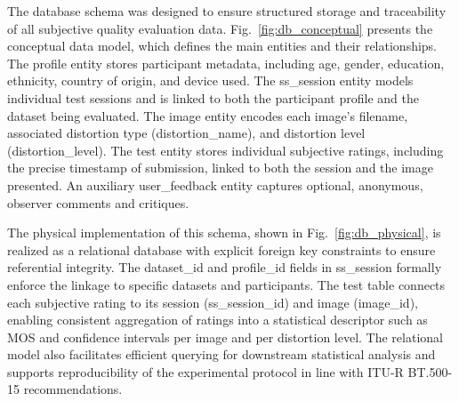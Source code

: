 The database schema was designed to ensure structured storage and traceability of all subjective quality evaluation data. Fig.~\ref{fig:db_conceptual} presents the conceptual data model, which defines the main entities and their relationships. The profile entity stores participant metadata, including age, gender, education, ethnicity, country of origin, and device used. The ss\_session entity models individual test sessions and is linked to both the participant profile and the dataset being evaluated. The image entity encodes each image's filename, associated distortion type (distortion\_name), and distortion level (distortion\_level). The test entity stores individual subjective ratings, including the precise timestamp of submission, linked to both the session and the image presented. An auxiliary user\_feedback entity captures optional, anonymous, observer comments and critiques.

The physical implementation of this schema, shown in Fig.~\ref{fig:db_physical}, is realized as a relational database with explicit foreign key constraints to ensure referential integrity. The dataset\_id and profile\_id fields in ss\_session formally enforce the linkage to specific datasets and participants. The test table connects each subjective rating to its session (ss\_session\_id) and image (image\_id), enabling consistent aggregation of ratings into a statistical descriptor such as MOS and confidence intervals per image and per distortion level. The relational model also facilitates efficient querying for downstream statistical analysis and supports reproducibility of the experimental protocol in line with ITU-R BT.500-15 recommendations.

